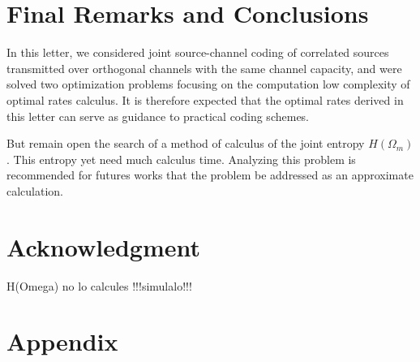 \documentclass[journal]{IEEEtran}
\begin{document}
\section{Final Remarks and Conclusions} 
\label{sec:Conclusions}
In this letter, we considered joint source-channel coding of correlated
sources transmitted over orthogonal channels with the same channel capacity, 
and were solved two optimization problems focusing on the computation low complexity  
of optimal rates calculus. 
It is therefore expected that the optimal rates derived in this letter can
serve as guidance to practical coding schemes.

But remain open the search of a method of 
calculus of the joint entropy $H(\Omega_m)$. This entropy yet need much calculus
time. Analyzing this problem is recommended for futures works that the problem
be addressed as an approximate calculation.

\section*{Acknowledgment}

H(Omega) no lo calcules !!!simulalo!!!


\section{Appendix} \label{sec:Appendix}
\end{document}
